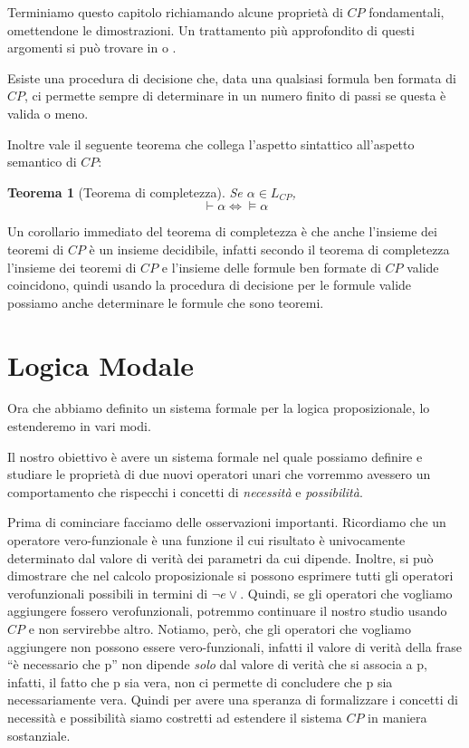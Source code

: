 \documentclass[a4paper, titlepage, 12pt]{report}
\newtheorem{theorem}{Teorema}[chapter]
\begin{document}
Terminiamo questo capitolo richiamando alcune proprietà di $CP$ fondamentali, omettendone
le dimostrazioni. Un trattamento più approfondito di questi argomenti si può trovare in
\cite{Tortora} o \cite{Mendelson}.

Esiste una procedura di decisione che, data una qualsiasi formula ben formata di $CP$,
ci permette sempre di determinare in un numero finito di passi se questa è valida o meno.

Inoltre vale il seguente teorema che collega l'aspetto sintattico all'aspetto semantico
di $CP$:

\begin{theorem}[Teorema di completezza]
Se $\alpha \in L_{CP}$,
$$\vdash \alpha \Leftrightarrow \vDash \alpha$$
\end{theorem}

Un corollario immediato del teorema di completezza è che anche l'insieme dei teoremi
di $CP$ è un insieme decidibile, infatti secondo il teorema di completezza
l'insieme dei teoremi di $CP$ e l'insieme delle formule ben formate di $CP$ valide
coincidono, quindi usando la procedura di decisione per le formule valide
possiamo anche determinare le formule che sono teoremi.

\chapter{Logica Modale}
Ora che abbiamo definito un sistema formale per la logica proposizionale,
lo estenderemo in vari modi.

Il nostro obiettivo è avere un sistema formale nel quale possiamo definire e studiare
le proprietà di due nuovi operatori unari che vorremmo avessero un comportamento che rispecchi
i concetti di \emph{necessità} e \emph{possibilità}.

Prima di cominciare facciamo delle osservazioni importanti.
Ricordiamo che un operatore vero-funzionale è una funzione il cui risultato
è univocamente determinato dal valore di verità dei parametri da cui dipende.
Inoltre, si può dimostrare che nel calcolo proposizionale si possono esprimere
tutti gli operatori verofunzionali possibili in termini di $\neg e \vee$.
Quindi, se gli operatori che vogliamo aggiungere fossero verofunzionali, potremmo
continuare il nostro studio usando $CP$ e non servirebbe altro.
Notiamo, però, che gli operatori che vogliamo aggiungere non possono essere vero-funzionali,
infatti il valore di verità della frase ``è necessario che p'' non dipende \emph{solo}
dal valore di verità che si associa a p, infatti, il fatto che p sia vera, non ci permette
di concludere che p sia necessariamente vera. Quindi per avere una speranza di formalizzare
i concetti di necessità e possibilità siamo costretti ad estendere il sistema $CP$
in maniera sostanziale.
\end{document}
